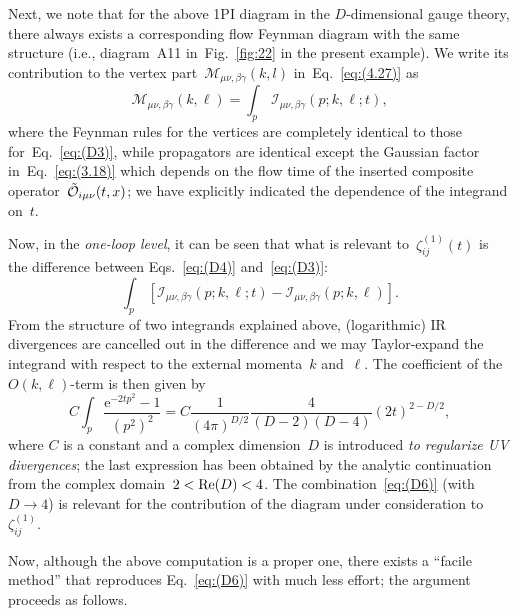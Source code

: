 Next, we note that for the above 1PI diagram in the $D$-dimensional gauge
theory, there always exists a corresponding flow Feynman diagram with the same
structure (i.e., diagram~A11 in~Fig.~\ref{fig:22} in the present example). We
write its contribution to the vertex
part~$\mathcal{M}_{\mu\nu,\beta\gamma}(k,l)$ in~Eq.~\eqref{eq:(4.27)} as
\begin{equation}
   \mathcal{M}_{\mu\nu,\beta\gamma}(k,\ell)=\int_p\,
   \mathcal{I}_{\mu\nu,\beta\gamma}(p;k,\ell;t),
\label{eq:(D4)}
\end{equation}
where the Feynman rules for the vertices are completely identical to those
for~Eq.~\eqref{eq:(D3)}, while propagators are identical except the
Gaussian factor in~Eq.~\eqref{eq:(3.18)} which depends on the flow time of
the inserted composite operator~$\Tilde{\mathcal{O}}_{i\mu\nu}(t,x)$; we have
explicitly indicated the dependence of the integrand on~$t$.

Now, in the \emph{one-loop level}, it can be seen that what is relevant
to~$\zeta^{(1)}_{ij}(t)$ is the difference between Eqs.~\eqref{eq:(D4)}
and~\eqref{eq:(D3)}:
\begin{equation}
   \int_p\,\left[
   \mathcal{I}_{\mu\nu,\beta\gamma}(p;k,\ell;t)
   -\mathcal{I}_{\mu\nu,\beta\gamma}(p;k,\ell)\right].
\label{eq:(D5)}
\end{equation}
From the structure of two integrands explained above, (logarithmic) IR
divergences are cancelled out in the difference and we may Taylor-expand the
integrand with respect to the external momenta~$k$ and~$\ell$. The coefficient
of the $O(k,\ell)$-term is then given by
\begin{equation}
   C\int_p\frac{\mathrm{e}^{-2tp^2}-1}{(p^2)^2}
   =C\frac{1}{(4\pi)^{D/2}}\frac{4}{(D-2)(D-4)}(2t)^{2-D/2},
\label{eq:(D6)}
\end{equation}
where $C$ is a constant and a complex dimension~$D$ is introduced \emph{to
regularize UV divergences}; the last expression has been obtained by the
analytic continuation from the complex domain~$2<\re(D)<4$. The
combination~\eqref{eq:(D6)} (with $D\to4$) is relevant for the contribution of
the diagram under consideration to~$\zeta_{ij}^{(1)}$.

Now, although the above computation is a proper one, there exists a ``facile
method'' that reproduces Eq.~\eqref{eq:(D6)} with much less effort; the
argument proceeds as follows.

